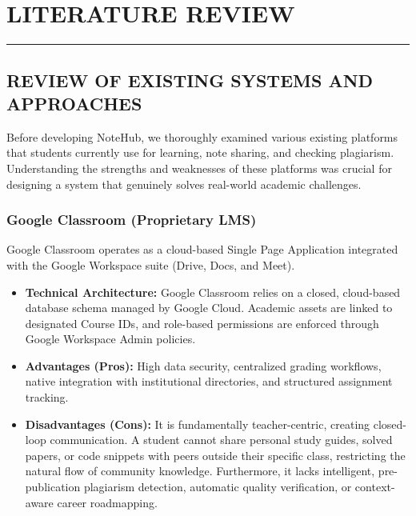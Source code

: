 \documentclass[12,Times new Roman,a4paper]{report}
\begin{document}
\chapter{LITERATURE REVIEW}
\rule{\textwidth}{1pt}
\paragraph{}
\section{REVIEW OF EXISTING SYSTEMS AND APPROACHES}

Before developing NoteHub, we thoroughly examined various existing platforms that students currently use for learning, note sharing, and checking plagiarism. Understanding the strengths and weaknesses of these platforms was crucial for designing a system that genuinely solves real-world academic challenges.

\subsection{Google Classroom (Proprietary LMS)}
Google Classroom operates as a cloud-based Single Page Application integrated with the Google Workspace suite (Drive, Docs, and Meet). 
\begin{itemize}
    \item \textbf{Technical Architecture:} Google Classroom relies on a closed, cloud-based database schema managed by Google Cloud. Academic assets are linked to designated Course IDs, and role-based permissions are enforced through Google Workspace Admin policies.
    \item \textbf{Advantages (Pros):} High data security, centralized grading workflows, native integration with institutional directories, and structured assignment tracking.
    \item \textbf{Disadvantages (Cons):} It is fundamentally teacher-centric, creating closed-loop communication. A student cannot share personal study guides, solved papers, or code snippets with peers outside their specific class, restricting the natural flow of community knowledge. Furthermore, it lacks intelligent, pre-publication plagiarism detection, automatic quality verification, or context-aware career roadmapping.
\end{itemize}
\end{document}
